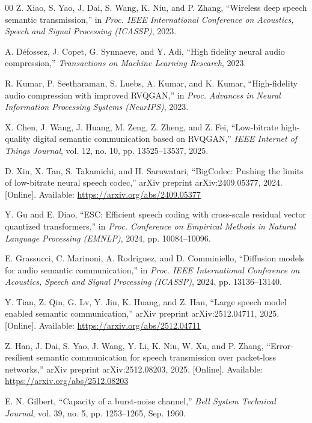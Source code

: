 \documentclass[lettersize,journal]{IEEEtran}
\begin{document}
\begin{thebibliography}{00}
 Z. Xiao, S. Yao, J. Dai, S. Wang, K. Niu, and P. Zhang, ``Wireless deep speech semantic transmission,'' in \emph{Proc. IEEE International Conference on Acoustics, Speech and Signal Processing (ICASSP)}, 2023.

 A. D\'efossez, J. Copet, G. Synnaeve, and Y. Adi, ``High fidelity neural audio compression,'' \emph{Transactions on Machine Learning Research}, 2023.

 R. Kumar, P. Seetharaman, S. Luebs, A. Kumar, and K. Kumar, ``High-fidelity audio compression with improved RVQGAN,'' in \emph{Proc. Advances in Neural Information Processing Systems (NeurIPS)}, 2023.

 X. Chen, J. Wang, J. Huang, M. Zeng, Z. Zheng, and Z. Fei, ``Low-bitrate high-quality digital semantic communication based on RVQGAN,'' \emph{IEEE Internet of Things Journal}, vol. 12, no. 10, pp. 13525--13537, 2025.

 D. Xin, X. Tan, S. Takamichi, and H. Saruwatari, ``BigCodec: Pushing the limits of low-bitrate neural speech codec,'' arXiv preprint arXiv:2409.05377, 2024. [Online]. Available: \url{https://arxiv.org/abs/2409.05377}

 Y. Gu and E. Diao, ``ESC: Efficient speech coding with cross-scale residual vector quantized transformers,'' in \emph{Proc. Conference on Empirical Methods in Natural Language Processing (EMNLP)}, 2024, pp. 10084--10096.

 E. Grassucci, C. Marinoni, A. Rodriguez, and D. Comminiello, ``Diffusion models for audio semantic communication,'' in \emph{Proc. IEEE International Conference on Acoustics, Speech and Signal Processing (ICASSP)}, 2024, pp. 13136--13140.

 Y. Tian, Z. Qin, G. Lv, Y. Jin, K. Huang, and Z. Han, ``Large speech model enabled semantic communication,'' arXiv preprint arXiv:2512.04711, 2025. [Online]. Available: \url{https://arxiv.org/abs/2512.04711}

 Z. Han, J. Dai, S. Yao, J. Wang, Y. Li, K. Niu, W. Xu, and P. Zhang, ``Error-resilient semantic communication for speech transmission over packet-loss networks,'' arXiv preprint arXiv:2512.08203, 2025. [Online]. Available: \url{https://arxiv.org/abs/2512.08203}

 E. N. Gilbert, ``Capacity of a burst-noise channel,'' \emph{Bell System Technical Journal}, vol. 39, no. 5, pp. 1253--1265, Sep. 1960.


\end{thebibliography}
\end{document}
